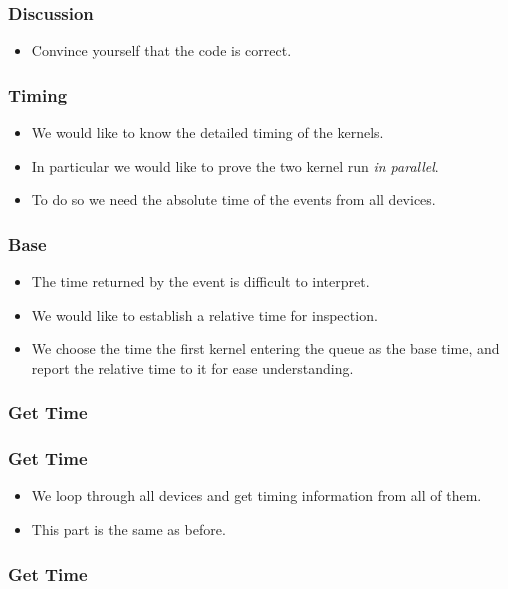 \documentclass{beamer}
\begin{document}
\begin{frame}
  \frametitle{Discussion}
  \begin{itemize}
    \item Convince yourself that the code is correct.
  \end{itemize}
\end{frame}

\begin{frame}
  \frametitle{Timing}
  \begin{itemize}
    \item We would like to know the detailed timing of the kernels.
    \item In particular we would like to prove the two kernel run {\em in
      parallel}.
    \item To do so we need the absolute time of the events from all devices.
  \end{itemize}
\end{frame}

\begin{frame}
  \frametitle{Base}
  \begin{itemize}
    \item The time returned by the event is difficult to interpret.
    \item We would like to establish a relative time for inspection.
      \item We choose the time the first kernel entering the queue as
        the base time, and report the relative time to it for ease
        understanding.
  \end{itemize}
\end{frame}

\begin{frame}
  \frametitle{Get Time}
\end{frame}

\begin{frame}
  \frametitle{Get Time}
  \begin{itemize}
    \item We loop through all devices and get timing information from
      all of them.
    \item This part is the same as before.
  \end{itemize}
\end{frame}

\begin{frame}
  \frametitle{Get Time}
\end{frame}
\end{document}
